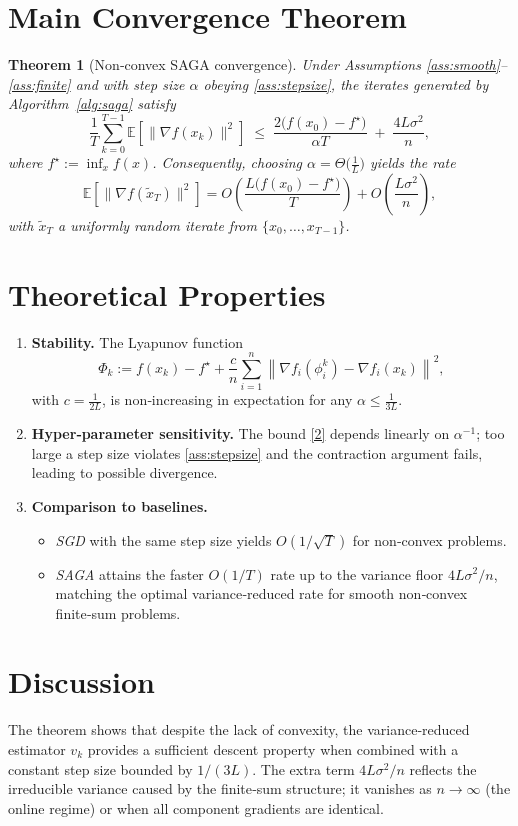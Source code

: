 \documentclass[11pt]{article}
\newtheorem{theorem}{Theorem}
\newcommand{\EE}{\mathbb{E}}
\newcommand{\norm}[1]{\left\lVert#1\right\rVert}
\newcommand{\grad}{\nabla}
\begin{document}
\section*{Main Convergence Theorem}
\begin{theorem}[Non‑convex SAGA convergence]\label{thm:main}
Under Assumptions \ref{ass:smooth}–\ref{ass:finite} and with step size $\alpha$ obeying \eqref{ass:stepsize},
the iterates generated by Algorithm~\ref{alg:saga} satisfy
\[
\frac{1}{T}\sum_{k=0}^{T-1}\EE\!\left[\big\|\grad f(x_k)\big\|^{2}\right]
\;\le\;
\frac{2\big(f(x_0)-f^\star\big)}{\alpha T}
\;+\;
\frac{4L\sigma^{2}}{n},
\tag{2}
\]
where $f^\star:=\inf_{x}f(x)$.  Consequently, choosing 
$\alpha =\Theta\!\big(\frac{1}{L}\big)$ yields the rate
\[
\EE\!\left[\big\|\grad f(\tilde x_T)\big\|^{2}\right]=O\!\left(\frac{L\big(f(x_0)-f^\star\big)}{T}\right)
+O\!\left(\frac{L\sigma^{2}}{n}\right),
\]
with $\tilde x_T$ a uniformly random iterate from $\{x_0,\dots,x_{T-1}\}$.
\end{theorem}

\section*{Theoretical Properties}
\begin{enumerate}[label=\arabic*.]
    \item \textbf{Stability.} The Lyapunov function 
    \[
    \Phi_k:= f(x_k)-f^\star+\frac{c}{n}\sum_{i=1}^{n}\norm{\grad f_i(\phi_i^k)-\grad f_i(x_k)}^{2},
    \]
    with $c=\frac{1}{2L}$, is non‑increasing in expectation for any $\alpha\le \frac{1}{3L}$.
    \item \textbf{Hyper‑parameter sensitivity.} The bound \eqref{2} depends linearly on $\alpha^{-1}$; too large a step size violates \eqref{ass:stepsize} and the contraction argument fails, leading to possible divergence.
    \item \textbf{Comparison to baselines.}
    \begin{itemize}
        \item \emph{SGD} with the same step size yields $O(1/\sqrt{T})$ for non‑convex problems.
        \item \emph{SAGA} attains the faster $O(1/T)$ rate up to the variance floor $4L\sigma^{2}/n$, matching the optimal variance‑reduced rate for smooth non‑convex finite‑sum problems.
    \end{itemize}
\end{enumerate}

\section*{Discussion}
The theorem shows that despite the lack of convexity, the variance‑reduced estimator $v_k$ provides a sufficient descent property when combined with a constant step size bounded by $1/(3L)$. The extra term $4L\sigma^{2}/n$ reflects the irreducible variance caused by the finite‑sum structure; it vanishes as $n\to\infty$ (the online regime) or when all component gradients are identical.
\end{document}
